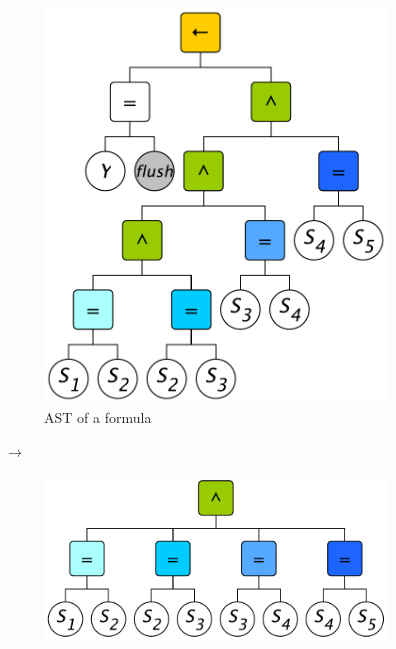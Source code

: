 
\begin{figure}
    \centering
    \def\astscale{0.38}
    \begin{subfigure}[]{0.25\linewidth}
        \centering
        \includegraphics[width=\linewidth]{figures/ast-flush-1.pdf}
        \caption{AST of a formula}
        \label{fig:ast-kins-unencoded}
    \end{subfigure}
    \hfill$\rightarrow$\hfill
    \begin{subfigure}[]{0.32\linewidth}
        \centering
        \includegraphics[width=\linewidth]{figures/ast-flush-2.pdf}

\end{subfigure}
\end{figure}
